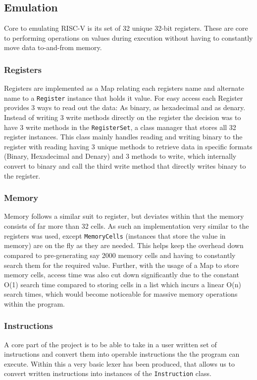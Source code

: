 \documentclass[a4paper,fleqn,twoside,12pt]{article}
\begin{document}
\subsection{Emulation}
Core to emulating RISC-V is its set of 32 unique 32-bit registers. These are core to performing operations on values during execution without having to constantly move data to-and-from memory.
\subsubsection{Registers}
Registers are implemented as a Map relating each registers name and alternate name to a \texttt{Register} instance that holds it value. For easy access each Register provides 3 ways to read out the data: As binary, as hexadecimal and as denary. Instead of writing 3 write methods directly on the register the decision was to have 3 write methods in the \texttt{RegisterSet}, a class manager that stores all 32 register instances. This class mainly handles reading and writing binary to the register with reading having 3 unique methods to retrieve data in specific formats (Binary, Hexadecimal and Denary) and 3 methods to write, which internally convert to binary and call the third write method that directly writes binary to the register.
\subsubsection{Memory}
Memory follows a similar suit to register, but deviates within that the memory consists of far more than 32 cells. As such an implementation very similar to the registers was used, except \texttt{MemoryCells} (instances that store the value in memory) are on the fly as they are needed. This helps keep the overhead down compared to pre-generating say 2000 memory cells and having to constantly search them for the required value. Further, with the usage of a Map to store memory cells, access time was also cut down significantly due to the constant O(1) search time compared to storing cells in a list which incurs a linear O(n) search times, which would become noticeable for massive memory operations within the program.

\subsubsection{Instructions}
A core part of the project is to be able to take in a user written set of instructions and convert them into operable instructions the the program can execute. Within this a very basic lexer has been produced, that allows us to convert written instructions into instances of the \texttt{Instruction} class.
\end{document}
